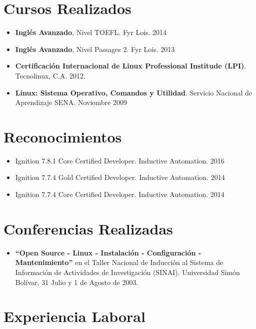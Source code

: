 \documentclass[letterpaper,11pt]{report}
\begin{document}
\section*{Cursos Realizados}
\begin{itemize}
\item \textbf{Inglés Avanzado}, Nivel TOEFL. Fyr Lois. 2014
\item \textbf{Inglés Avanzado}, Nivel Passages 2. Fyr Lois. 2013
\item \textbf{Certificación Internacional de Linux Professional Institude (LPI)}. Tecnolinux, C.A. 2012.
\item \textbf{Linux: Sistema Operativo, Comandos y Utilidad}. Servicio Nacional de Aprendizaje SENA. Noviembre 2009
\end{itemize}

\section*{Reconocimientos}
\begin{itemize}
    \item Ignition 7.8.1 Core Certified Developer. Inductive Automation. 2016
    \item Ignition 7.7.4 Gold Certified Developer. Inductive Automation. 2014
    \item Ignition 7.7.4 Core Certified Developer. Inductive Automation. 2014
\end{itemize}

\section*{Conferencias Realizadas}
\begin{itemize}
\item
\textbf{``Open Source - Linux - Instalación - Configuración - Mantenimiento''} en el Taller Nacional de Inducción al Sistema de Información de Actividades de Investigación (SINAI). Universidad Simón Bolívar, 31 Julio y 1 de Agosto de 2003.
\end{itemize}

\section*{Experiencia Laboral}
\end{document}
